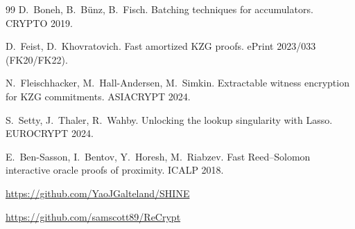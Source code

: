 \begin{thebibliography}{99}
D.~Boneh, B.~B\"unz, B.~Fisch.
Batching techniques for accumulators.
CRYPTO 2019.

D.~Feist, D.~Khovratovich.
Fast amortized KZG proofs.
ePrint 2023/033 (FK20/FK22).

N.~Fleischhacker, M.~Hall-Andersen, M.~Simkin.
Extractable witness encryption for KZG commitments.
ASIACRYPT 2024.

S.~Setty, J.~Thaler, R.~Wahby.
Unlocking the lookup singularity with Lasso.
EUROCRYPT 2024.

E.~Ben-Sasson, I.~Bentov, Y.~Horesh, M.~Riabzev.
Fast Reed--Solomon interactive oracle proofs of proximity.
ICALP 2018.

\url{https://github.com/YaoJGalteland/SHINE}

\url{https://github.com/samscott89/ReCrypt}

\end{thebibliography}

